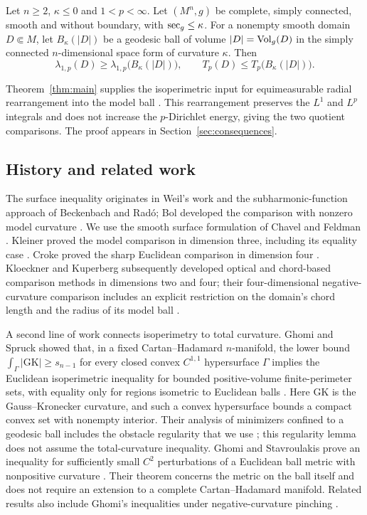 \begin{corollary}
\label{cor:model-ball-spectral}
Let $n\ge2$, $\kappa\le0$ and $1<p<\infty$. Let $(M^n,g)$ be complete,
simply connected, smooth and without boundary, with $\operatorname{sec}_g\le\kappa$.
For a nonempty smooth domain $D\Subset M$, let $B_\kappa(|D|)$ be a
geodesic ball of volume $|D|=\operatorname{Vol}_g(D)$ in the simply connected
$n$-dimensional space form of curvature $\kappa$. Then
\[
 \lambda_{1,p}(D)\ge\lambda_{1,p}\bigl(B_\kappa(|D|)\bigr),
 \qquad T_p(D)\le T_p\bigl(B_\kappa(|D|)\bigr).
\]
\end{corollary}

Theorem~\ref{thm:main} supplies the isoperimetric input for
equimeasurable radial rearrangement into the model ball
\cite{NobiliViolo2025}. This rearrangement preserves the $L^1$ and
$L^p$ integrals and does not increase the $p$-Dirichlet energy,
giving the two quotient comparisons. The proof appears in
Section~\ref{sec:consequences}.

\subsection{History and related work}

The surface inequality originates in Weil's work and the
subharmonic-function approach of Beckenbach and Rad\'o; Bol developed
the comparison with nonzero model curvature
\cite{Weil1926,BeckenbachRado1933,Bol1941}.
We use the smooth surface formulation of Chavel and Feldman
\cite{ChavelFeldman1980}. Kleiner proved the model comparison in
dimension three, including its equality case
\cite[Theorem~2]{Kleiner1992}. Croke proved the sharp Euclidean
comparison in dimension four \cite{Croke1984}. Kloeckner and Kuperberg
subsequently developed optical and chord-based comparison methods in
dimensions two and four; their four-dimensional negative-curvature
comparison includes an explicit restriction on the domain's chord
length and the radius of its model ball
\cite[Theorem~1.5]{KloecknerKuperberg2019}.

A second line of work connects isoperimetry to total curvature.
Ghomi and Spruck showed that, in a fixed Cartan--Hadamard
$n$-manifold, the lower bound $\int_\Gamma|\mathrm{GK}|\ge s_{n-1}$
for every closed convex $C^{1,1}$ hypersurface $\Gamma$ implies the
Euclidean isoperimetric inequality for bounded positive-volume
finite-perimeter sets, with equality only for regions isometric to
Euclidean balls \cite[Theorem~7.1]{GhomiSpruck2022}. Here
$\mathrm{GK}$ is the Gauss--Kronecker curvature, and such a convex
hypersurface bounds a compact convex set with nonempty interior. Their analysis of minimizers
confined to a geodesic ball includes the obstacle regularity that we
use \cite[Lemma~7.2(i),(ii)]{GhomiSpruck2022}; this regularity lemma
does not assume the total-curvature inequality. Ghomi and Stavroulakis
prove an inequality for sufficiently small $C^2$ perturbations of a
Euclidean ball metric with nonpositive curvature
\cite{GhomiStavroulakis2026}. Their theorem concerns the metric on the
ball itself and does not require an extension to a complete
Cartan--Hadamard manifold. Related results also include Ghomi's
inequalities under negative-curvature pinching \cite{Ghomi2026Pinched}.

